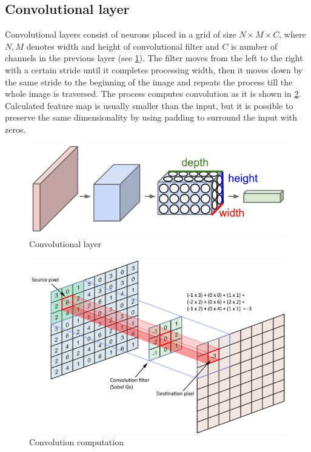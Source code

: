 \documentclass[twoside]{ctuthesis}
\theoremstyle{plain}
\theoremstyle{definition}
\theoremstyle{note}
\begin{document}
\subsection{Convolutional layer} 
Convolutional layers consist of neurons placed in a grid of size $N \times M \times C$, where $N, M$ denotes width and height of convolutional filter and $C$ is number of channels in the previous layer (see \ref{convolutional_layer}). The filter moves from the left to the right with a certain stride until it completes processing width, then it moves down by the same stride to the beginning of the image    and repeats the process till the whole image is traversed. The process computes convolution as it is shown in \ref{conv_comp}. Calculated feature map is usually smaller than the input, but it is possible to preserve the same dimensionality by using padding to surround the input with zeros. 
\begin{figure}[h]
\caption{Convolutional layer\cite{cs231n}}
\label{convolutional_layer}
\includegraphics[width=\textwidth]{images/neural_networks/cnn.jpeg}
\end{figure}
\begin{figure}[h]
\caption{Convolution computation\cite{cs231n}}
\label{conv_comp}
\includegraphics[width=\textwidth]{images/neural_networks/conv.png}
\end{figure}
\end{document}

